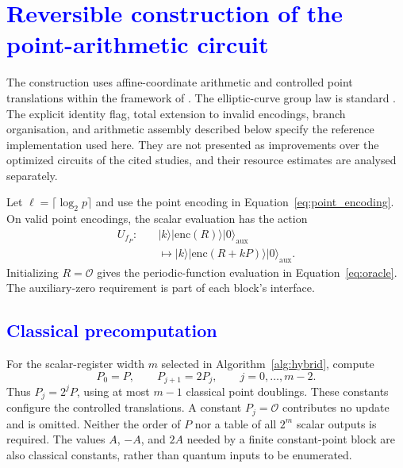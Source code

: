 \section{\textcolor{blue}{Reversible construction of the point-arithmetic circuit}}
\label{app:oracle}

\begin{revision}
The construction uses affine-coordinate arithmetic and controlled point
translations within the framework of \cite{ProosZalka2003,Roetteler2017}.
The elliptic-curve group law is standard
\cite{Silverman2009,Washington2008}. The explicit identity flag, total
extension to invalid encodings, branch organisation, and arithmetic
assembly described below specify the reference implementation used here.
They are not presented as improvements over the optimized circuits of
the cited studies, and their resource estimates are analysed separately.

Let $\ell=\lceil\log_2 p\rceil$ and use the point encoding in
Equation~\eqref{eq:point_encoding}. On valid point encodings, the scalar
evaluation has the action
\begin{equation}
\label{eq:reversible_circuit}
\begin{aligned}
U_{f_P}:\quad
&\lvert k\rangle\lvert\mathrm{enc}(R)\rangle
 \lvert0\rangle_{\mathrm{aux}}\\
&\longmapsto
 \lvert k\rangle\lvert\mathrm{enc}(R+kP)\rangle
 \lvert0\rangle_{\mathrm{aux}}.
\end{aligned}
\end{equation}
Initializing $R=\mathcal O$ gives the periodic-function evaluation in
Equation~\eqref{eq:oracle}. The auxiliary-zero requirement is part of
each block's interface.
\end{revision}

\subsection{\textcolor{blue}{Classical precomputation}}
\begin{revision}
For the scalar-register width $m$ selected in Algorithm~\ref{alg:hybrid},
compute
\[
P_0=P,\qquad P_{j+1}=2P_j,
\qquad j=0,\ldots,m-2.
\]
Thus $P_j=2^jP$, using at most $m-1$ classical point doublings. These
constants configure the controlled translations. A constant
$P_j=\mathcal O$ contributes no update and is omitted. Neither the order
of $P$ nor a table of all $2^m$ scalar outputs is required. The values
$A$, $-A$, and $2A$ needed by a finite constant-point block are also
classical constants, rather than quantum inputs to be enumerated.
\end{revision}

